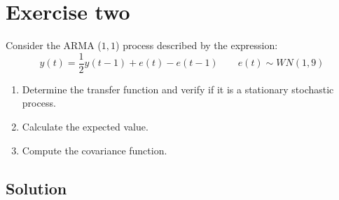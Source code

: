 \section{Exercise two}

Consider the ARMA ($1,1$) process described by the expression:
\[y(t)=\dfrac{1}{2}y(t-1)+e(t)-e(t-1) \qquad e(t)\sim WN(1,9)\]
\begin{enumerate}
    \item Determine the transfer function and verify if it is a stationary stochastic process.
    \item Calculate the expected value.
    \item Compute the covariance function.
\end{enumerate}

\subsection*{Solution}
